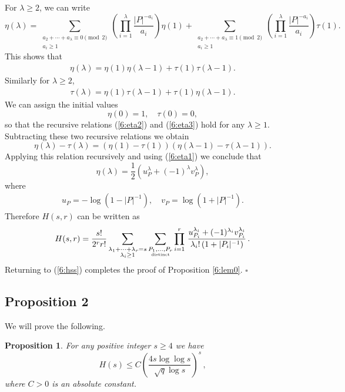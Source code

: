 \documentclass[12pt]{amsart}
\theoremstyle{plain}
\newtheorem{prop}{Proposition}
\begin{document}
For $\lambda \ge 2$, we can write
\[\eta(\lambda)=\sum_{\substack{a_2+ \cdots+a_{\lambda} \equiv 0 \pmod{2} \\ a_i \ge 1}} \left(\prod_{i=1}^{\lambda}\frac{|P|^{-a_i}}{a_i}\right) \eta(1)+\sum_{\substack{a_2+ \cdots+a_{\lambda} \equiv 1 \pmod{2} \\ a_i \ge 1}} \left(\prod_{i=1}^{\lambda}\frac{|P|^{-a_i}}{a_i}\right) \tau(1).\]
This shows that
\begin{eqnarray} \label{6:eta2} \eta(\lambda)=\eta(1) \eta(\lambda-1)+\tau(1) \tau(\lambda-1).\end{eqnarray}
Similarly for $\lambda \ge 2$,
\begin{eqnarray} \label{6:eta3} \tau(\lambda)=\eta(1) \tau(\lambda-1)+\tau(1) \eta(\lambda-1).\end{eqnarray}
We can assign the initial values
\[\eta(0)=1, \quad \tau(0)=0,\]
so that the recursive relations (\ref{6:eta2}) and (\ref{6:eta3}) hold for any $\lambda \ge 1$. Subtracting these two recursive relations we obtain
\[\eta(\lambda)-\tau(\lambda)=\left(\eta(1)-\tau(1)\right)
\left(\eta(\lambda-1)-\tau(\lambda-1)\right).\]
Applying this relation recursively and using (\ref{6:eta1}) we conclude that
\[\eta(\lambda)=\frac{1}{2} \left(u_P^{\lambda}+(-1)^{\lambda}v_P^{\lambda}\right),\]
where
\begin{eqnarray*} u_P=-\log \left(1-|P|^{-1}\right), \quad v_P=\log \left(1+|P|^{-1}\right). \end{eqnarray*}
Therefore $H(s,r)$ can be written as
\begin{eqnarray*} H(s,r)=\frac{s!}{2^r r!}\sum_{\substack{\lambda_1+\cdots+\lambda_r=s\\ \lambda_i \ge 1}}\sum_{\substack{P_1,\ldots,P_r\\ \mbox{\tiny distinct}}} \prod_{i=1}^r\,\frac{u_{P_i}^{\lambda_i}+(-1)^{\lambda_i}
v_{P_i}^{\lambda_i}}{\lambda_i! \left(1+|P_i|^{-1}\right)}\,.\end{eqnarray*}
Returning to (\ref{6:hss}) completes the proof of Proposition \ref{6:lem0}. \quad $\square$


\subsection{Proposition 2} We will prove the following.
\begin{prop} \label{6:lem3} For any positive integer $s \ge 4$ we have
\[H(s) \le C \left(\frac{4s \log \log s}{\sqrt{q}\log s}\right)^s\,,\]
where $C>0$ is an absolute constant.
\end{prop}
\end{document}
